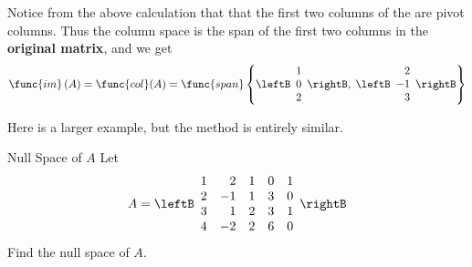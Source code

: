 \begin{solution}
Notice from the above calculation that that the first two columns of the \rref \; are pivot
columns. Thus the  column space is the span of the first two  columns in
the \textbf{original matrix}, and we get 
\begin{equation*}
\func{im}\left( A\right) = \func{col}(A) =
\func{span} \left\{ \leftB 
\begin{array}{r}
1 \\ 
0 \\ 
2 
\end{array}
\rightB, \; \leftB 
\begin{array}{r}
2 \\ 
-1 \\ 
3 
\end{array}
\rightB  \right\}
\end{equation*}

\end{solution}

Here is a larger example, but the method is entirely similar.

\begin{example}{Null Space of $A$}\label{exa:nullspace2}
Let
\begin{equation*}
A=\leftB
\begin{array}{rrrrr}
1 & 2 & 1 & 0 & 1 \\
2 & -1 & 1 & 3 & 0 \\
3 & 1 & 2 & 3 & 1 \\
4 & -2 & 2 & 6 & 0
\end{array}
\rightB
\end{equation*}
Find the null space of $A$.
\end{example}

